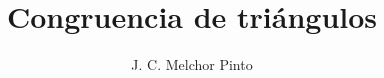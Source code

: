 \documentclass[12pt,addpoints,answers]{guia}
\title{Congruencia de triángulos}
\author{J. C. Melchor Pinto}
\begin{document}
\pagestyle{headandfoot}
\INFO
\begin{multicols}{2}
    
    
    \columnbreak
    
\end{multicols}



\begin{questions}
    \questionboxed[10]{}
    \questionboxed[10]{}
    \questionboxed[10]{}
    \questionboxed[10]{}
    \questionboxed[10]{}
    \questionboxed[10]{}
    \questionboxed[10]{}
    \questionboxed[10]{}
    \questionboxed[10]{}
    \questionboxed[10]{}
\end{questions}
\end{document}
